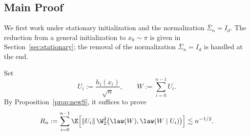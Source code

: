 \documentclass[mnsc,nonblindrev]{informs3}
\begin{document}
\subsection{Main Proof}\label{sec:proof-MC-W1-Raic}

We first work under stationary initialization and the normalization
\(\bar\Sigma_n=I_d\). The reduction from a general initialization to
\(x_0\sim\pi\) is given in Section~\ref{sec:stationary}; the removal of the
normalization \(\bar\Sigma_n=I_d\) is handled at the end.

Set
\[
  U_i:=\frac{h_i(x_i)}{\sqrt n},
  \qquad
  W:=\sum_{i=0}^{n-1}U_i.
\]
By Proposition~\ref{prop:newS}, it suffices to prove
\begin{equation}\label{eq:Rn-goal}
  R_n
  :=
  \sum_{i=0}^{n-1}
  \E\Big[
    \|U_i\|\,\W_2^2\bigl(\law(W),\law(W\mid U_i)\bigr)
  \Big]
  \lesssim n^{-1/2}.
\end{equation}
\end{document}
